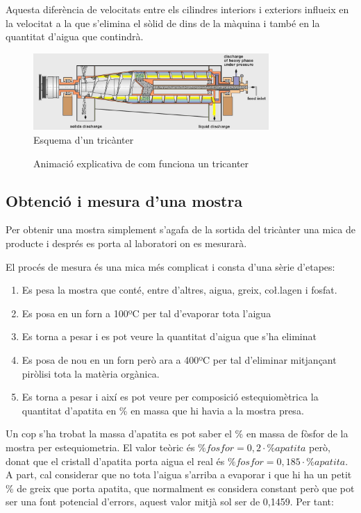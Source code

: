 \documentclass[a4paper]{article}
\begin{document}
Aquesta diferència de velocitats entre els cilindres interiors i exteriors influeix en la velocitat a la que s'elimina el sòlid de dins de la màquina i també en la quantitat d'aigua que contindrà.

\begin{figure}[H]
	\centering
	\includegraphics[width=0.8\textwidth]{images/tricanter}
	\caption{Esquema d'un tricànter}
	\label{fig:tricanter}
\end{figure}

\begin{figure}[H]
	\centering
	\caption{Animació explicativa de com funciona un tricanter}
\end{figure}

\subsection{Obtenció i mesura d'una mostra}
Per obtenir una mostra simplement s'agafa de la sortida del tricànter una mica de producte i després es porta al laboratori on es mesurarà.

El procés de mesura és una mica més complicat i consta d'una sèrie d'etapes:

\begin{enumerate}
	\item Es pesa la mostra que conté, entre d'altres, aigua, greix, co\l.lagen i fosfat.
	\item Es posa en un forn a 100ºC per tal d'evaporar tota l'aigua 
	\item Es torna a pesar i es pot veure la quantitat d'aigua que s'ha eliminat
	\item Es posa de nou en un forn però ara a 400ºC per tal d'eliminar mitjançant piròlisi tota la matèria orgànica.
	\item Es torna a pesar i així es pot veure per composició estequiomètrica la quantitat d'apatita en \% en massa que hi havia a la mostra presa.
\end{enumerate} 

Un cop s'ha trobat la massa d'apatita es pot saber el \% en massa de fòsfor de la mostra per estequiometria. El valor teòric és $\% fosfor = 0,2 \cdot \% apatita$ però, donat que el cristall d'apatita porta aigua el real és $\% fosfor = 0,185 \cdot \% apatita$. A part, cal considerar que no tota l'aigua s'arriba a evaporar i que hi ha un petit \% de greix que porta apatita, que normalment es considera constant però que pot ser una font potencial d'errors, aquest valor mitjà sol ser de 0,1459. Per tant:
\end{document}
